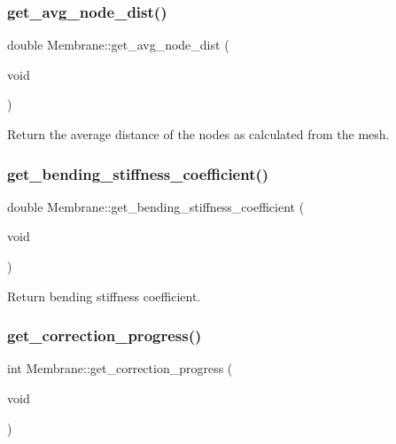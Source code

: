 \mbox{\label{classMembrane_a32ed30019d57e8d4e51341709a8997f2}} 
\subsubsection{\texorpdfstring{get\_avg\_node\_dist()}{get\_avg\_node\_dist()}}
{\footnotesize\ttfamily double Membrane\+::get\+\_\+avg\+\_\+node\+\_\+dist (\begin{DoxyParamCaption}\item[{void}]{ }\end{DoxyParamCaption})\hspace{0.3cm}{\ttfamily [inline]}}

Return the average distance of the nodes as calculated from the mesh. \mbox{\label{classMembrane_ae1e3082fdde5dbef11fb6c3b7cc97c0a}} 
\subsubsection{\texorpdfstring{get\_bending\_stiffness\_coefficient()}{get\_bending\_stiffness\_coefficient()}}
{\footnotesize\ttfamily double Membrane\+::get\+\_\+bending\+\_\+stiffness\+\_\+coefficient (\begin{DoxyParamCaption}\item[{void}]{ }\end{DoxyParamCaption})\hspace{0.3cm}{\ttfamily [inline]}}

Return bending stiffness coefficient. \mbox{\label{classMembrane_ad3960f87e60282211a1266f4d3318dc0}} 
\subsubsection{\texorpdfstring{get\_correction\_progress()}{get\_correction\_progress()}}
{\footnotesize\ttfamily int Membrane\+::get\+\_\+correction\+\_\+progress (\begin{DoxyParamCaption}\item[{void}]{ }\end{DoxyParamCaption})\hspace{0.3cm}{\ttfamily [inline]}}

